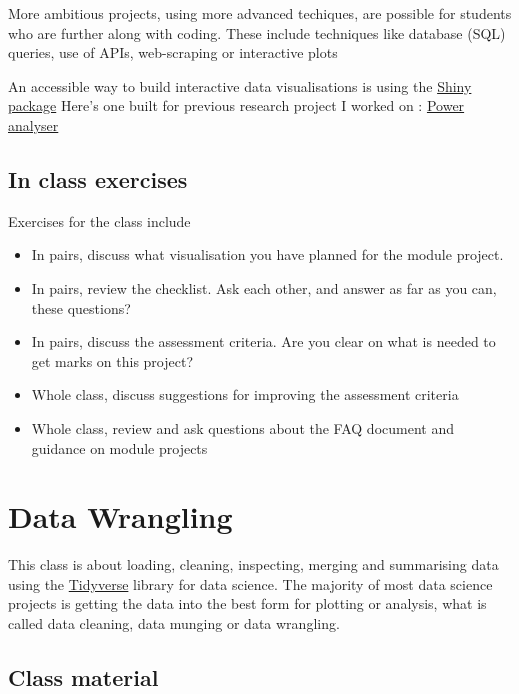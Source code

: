 \documentclass[
]{book}
\providecommand{\tightlist}{%
  \setlength{\itemsep}{0pt}\setlength{\parskip}{0pt}}
\begin{document}
More ambitious projects, using more advanced techiques, are possible for students who are further along with coding. These include techniques like database (SQL) queries, use of APIs, web-scraping or interactive plots

An accessible way to build interactive data visualisations is using the \href{https://shiny.rstudio.com/}{Shiny package} Here's one built for previous research project I worked on : \href{https://sheffield-university.shinyapps.io/decision_power/}{Power analyser}

\hypertarget{in-class-exercises}{%
\section{In class exercises}\label{in-class-exercises}}

Exercises for the class include

\begin{itemize}
\tightlist
\item
  In pairs, discuss what visualisation you have planned for the module project.
\item
  In pairs, review the checklist. Ask each other, and answer as far as you can, these questions?
\item
  In pairs, discuss the assessment criteria. Are you clear on what is needed to get marks on this project?
\item
  Whole class, discuss suggestions for improving the assessment criteria
\item
  Whole class, review and ask questions about the FAQ document and guidance on module projects
\end{itemize}

\hypertarget{data-wrangling}{%
\chapter{Data Wrangling}\label{data-wrangling}}

This class is about loading, cleaning, inspecting, merging and summarising data using the \href{https://www.tidyverse.org/}{Tidyverse} library for data science. The majority of most data science projects is getting the data into the best form for plotting or analysis, what is called data cleaning, data munging or data wrangling.

\hypertarget{class-material-2}{%
\section{Class material}\label{class-material-2}}
\end{document}
